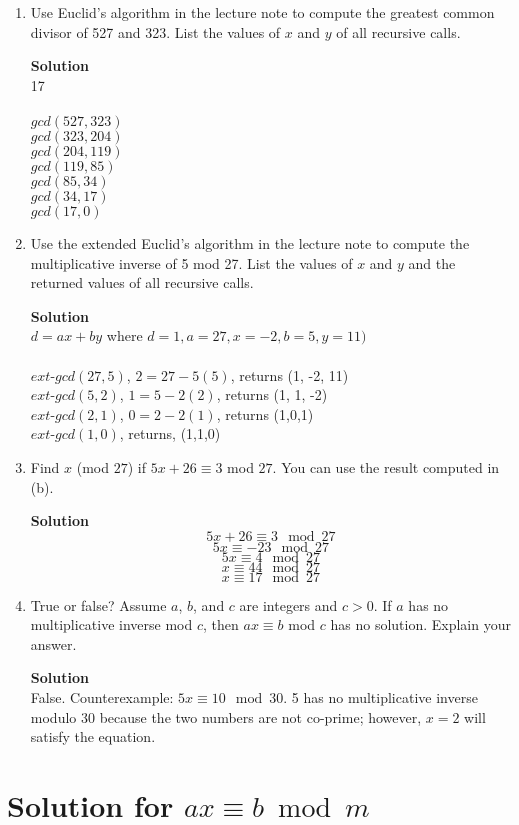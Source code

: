 \documentclass[11pt]{article}
\newcommand*{\Question}[1]{\section{#1}}
\newenvironment{Parts}{\begin{enumerate}[label=(\alph*)]}{\end{enumerate}}
\newcommand*{\Part}{\item}
\newenvironment{Answer}{\vspace{10pt}\begin{mdframed}\textbf{Solution}\\}{\end{mdframed}\vfill\pagebreak[3]}
\newenvironment{Answer}{\vspace{10pt}}{\vfill\pagebreak[3]}
\begin{document}
\begin{Parts}
	\Part Use Euclid's algorithm in the lecture note to compute the greatest common divisor of 527 and 323. List the values of $x$ and $y$ of all recursive calls.
	\begin{Answer}
	    17
	    \\
	    \\
		$gcd(527, 323)$\\
		$gcd(323, 204)$\\
		$gcd(204, 119)$\\
		$gcd(119, 85)$\\
		$gcd(85, 34)$\\
		$gcd(34, 17)$\\
		$gcd(17, 0)$
	\end{Answer}
	\Part Use the extended Euclid's algorithm in the lecture note to compute the multiplicative inverse of 5 mod 27. List the values of $x$ and $y$ and the returned values of all recursive calls.
	\begin{Answer}
	$d=ax+by$ where $d=1, a=27, x=-2, b=5, y=11)$
	\\
	\\
	$ext$-$gcd(27, 5)$, $2=27-5(5)$, returns (1, -2, 11)\\
	$ext$-$gcd(5, 2)$, $1=5-2(2)$, returns (1, 1, -2)\\
	$ext$-$gcd(2, 1)$, $0=2-2(1)$, returns (1,0,1) \\
	$ext$-$gcd(1, 0)$, returns, (1,1,0)\\
		
	\end{Answer}
	\Part Find $x$ (mod $27$) if $5x+26\equiv 3$ mod $27$. You can use the result computed in (b).
	\begin{Answer}
		$$5x+26 \equiv 3 \mod 27$$
		$$5x \equiv -23 \mod 27$$
		$$5x \equiv 4 \mod 27$$
		$$x \equiv 44 \mod 27$$
		$$x \equiv 17 \mod 27$$
	\end{Answer}
	\Part True or false? Assume $a$, $b$, and $c$ are integers and $c>0$. If $a$ has no multiplicative inverse mod $c$, then $ax \equiv b$ mod $c$ has no solution. Explain your answer.
	\begin{Answer}
		False. Counterexample: $5x \equiv 10 \mod 30$. 5 has no multiplicative inverse modulo 30 because the two numbers are not co-prime; however, $x=2$ will satisfy the equation.
	\end{Answer}
\end{Parts}


\Question{Solution for $ax \equiv b \bmod m$}
\end{document}
